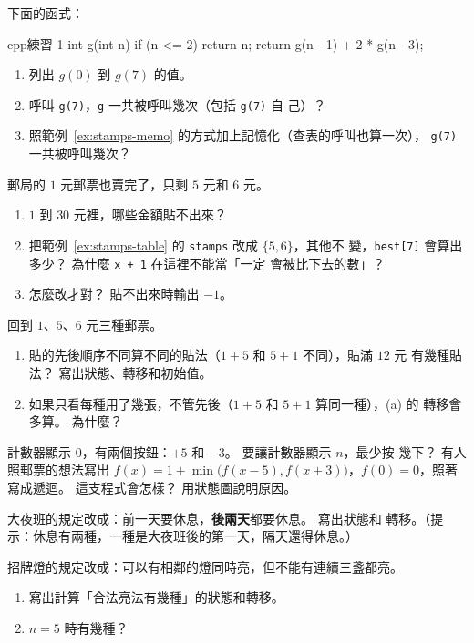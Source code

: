 \begin{drills}[label=drills:dp1]
\item 下面的函式：
\begin{code}{cpp}{練習 1}
int g(int n) {
    if (n <= 2) {
        return n;
    }
    return g(n - 1) + 2 * g(n - 3);
}
\end{code}
\begin{enumerate}
\item 列出 $g(0)$ 到 $g(7)$ 的值。
\item 呼叫 \texttt{g(7)}，\texttt{g} 一共被呼叫幾次（包括 \texttt{g(7)} 自
己）？
\item 照範例~\ref{ex:stamps-memo} 的方式加上記憶化（查表的呼叫也算一次），
\texttt{g(7)} 一共被呼叫幾次？
\end{enumerate}

\item 郵局的 $1$ 元郵票也賣完了，只剩 $5$ 元和 $6$ 元。
\begin{enumerate}
\item $1$ 到 $30$ 元裡，哪些金額貼不出來？
\item 把範例~\ref{ex:stamps-table} 的 \texttt{stamps} 改成 $\{5, 6\}$，其他不
變，\texttt{best[7]} 會算出多少？ 為什麼 \texttt{x + 1} 在這裡不能當「一定
會被比下去的數」？
\item 怎麼改才對？ 貼不出來時輸出 $-1$。
\end{enumerate}

\item 回到 $1$、$5$、$6$ 元三種郵票。
\begin{enumerate}
\item 貼的先後順序不同算不同的貼法（$1 + 5$ 和 $5 + 1$ 不同），貼滿 $12$ 元
有幾種貼法？ 寫出狀態、轉移和初始值。
\item 如果只看每種用了幾張，不管先後（$1 + 5$ 和 $5 + 1$ 算同一種），(a) 的
轉移會多算。 為什麼？
\end{enumerate}

\item 計數器顯示 $0$，有兩個按鈕：$+5$ 和 $-3$。 要讓計數器顯示 $n$，最少按
幾下？ 有人照郵票的想法寫出
$f(x) = 1 + \min\bigl(f(x - 5), f(x + 3)\bigr)$，$f(0) = 0$，照著寫成遞迴。
這支程式會怎樣？ 用狀態圖說明原因。

\item 大夜班的規定改成：前一天要休息，\textbf{後兩天}都要休息。 寫出狀態和
轉移。（提示：休息有兩種，一種是大夜班後的第一天，隔天還得休息。）

\item 招牌燈的規定改成：可以有相鄰的燈同時亮，但不能有連續三盞都亮。
\begin{enumerate}
\item 寫出計算「合法亮法有幾種」的狀態和轉移。
\item $n = 5$ 時有幾種？
\end{enumerate}


\end{drills}
